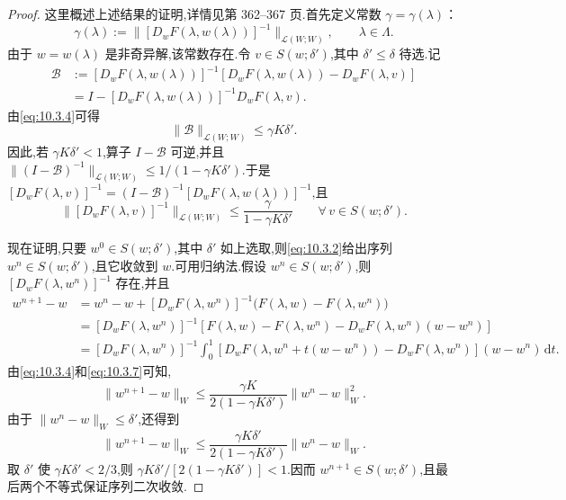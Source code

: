 \begin{proof}
这里概述上述结果的证明,详情见第 362–367 页.首先定义常数 \(\gamma=\gamma(\lambda)\)：
\[
  \gamma(\lambda):=\|[D_wF(\lambda,w(\lambda))]^{-1}\|_{\mathcal L(W;W)},
       \qquad\lambda\in\Lambda.
\]
由于 \(w=w(\lambda)\) 是非奇异解,该常数存在.令 \(v\in S(w;\delta')\),其中 \(\delta'\le\delta\) 待选.记
\[
  \begin{aligned}
    \mathcal B&:=[D_wF(\lambda,w(\lambda))]^{-1}
        [D_wF(\lambda,w(\lambda))-D_wF(\lambda,v)]\\
        &=I-[D_wF(\lambda,w(\lambda))]^{-1}D_wF(\lambda,v).
  \end{aligned}
\]
由\eqref{eq:10.3.4}可得
\[
  \|\mathcal B\|_{\mathcal L(W;W)}\le\gamma K\delta'.
\]
因此,若 \(\gamma K\delta'<1\),算子 \(I-\mathcal B\) 可逆,并且
\(\|(I-\mathcal B)^{-1}\|_{\mathcal L(W;W)}\le1/(1-\gamma K\delta')\).于是
\([D_wF(\lambda,v)]^{-1}=(I-\mathcal B)^{-1}[D_wF(\lambda,w(\lambda))]^{-1}\),且
\begin{equation}\label{eq:10.3.7}
  \|[D_wF(\lambda,v)]^{-1}\|_{\mathcal L(W;W)}
      \le\frac{\gamma}{1-\gamma K\delta'}\qquad\forall\,v\in S(w;\delta').
\end{equation}

现在证明,只要 \(w^0\in S(w;\delta')\),其中 \(\delta'\) 如上选取,则\eqref{eq:10.3.2}给出序列 \(w^n\in S(w;\delta')\),且它收敛到 \(w\).可用归纳法.假设 \(w^n\in S(w;\delta')\),则 \([D_wF(\lambda,w^n)]^{-1}\) 存在,并且
\[
  \begin{aligned}
    w^{n+1}-w
      &=w^n-w+[D_wF(\lambda,w^n)]^{-1}\bigl(F(\lambda,w)-F(\lambda,w^n)\bigr)\\
      &=[D_wF(\lambda,w^n)]^{-1}
        [F(\lambda,w)-F(\lambda,w^n)-D_wF(\lambda,w^n)(w-w^n)]\\
      &=[D_wF(\lambda,w^n)]^{-1}
        \int_0^1[D_wF(\lambda,w^n+t(w-w^n))-D_wF(\lambda,w^n)](w-w^n)\,\mathrm dt .
  \end{aligned}
\]
由\eqref{eq:10.3.4}和\eqref{eq:10.3.7}可知,
\[
  \|w^{n+1}-w\|_W
      \le\frac{\gamma K}{2(1-\gamma K\delta')}\|w^n-w\|_W^2.
\]
由于 \(\|w^n-w\|_W\le\delta'\),还得到
\[
  \|w^{n+1}-w\|_W
      \le\frac{\gamma K\delta'}{2(1-\gamma K\delta')}\|w^n-w\|_W.
\]
取 \(\delta'\) 使 \(\gamma K\delta'<2/3\),则 \(\gamma K\delta'/[2(1-\gamma K\delta')]<1\).因而 \(w^{n+1}\in S(w;\delta')\),且最后两个不等式保证序列二次收敛.


\end{proof}
